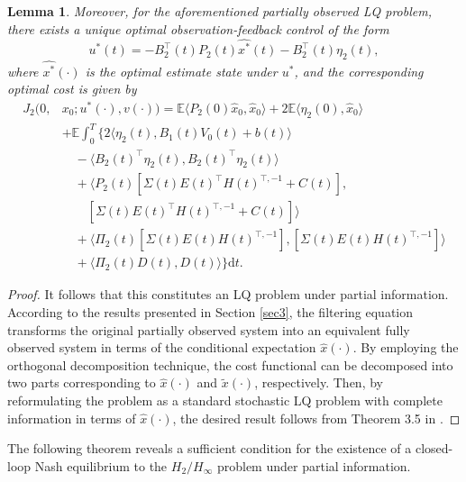\documentclass[lettersize,journal]{IEEEtran}
\theoremstyle{plain}
\newtheorem{lem}[thm]{Lemma}
\theoremstyle{definition}
\begin{document}
\begin{lem}
	Moreover, for the aforementioned partially observed LQ problem, there exists a unique optimal observation-feedback control of the form 
	\[
	u^*(t) = -B_2^{\top}(t)P_2(t)\widehat{x^*}(t) - B_2^{\top}(t)\eta_2(t),
	\]
	where $\widehat{x^*}(\cdot)$ is the optimal estimate state under $u^*$,
	and the corresponding optimal cost is given by
	\begin{equation}\label{eq:5.12}
		\begin{aligned}
			J_2(0,&x_0;u^*(\cdot),v(\cdot)) = \mathbb{E} \langle P_2(0)\widehat{x}_0,\widehat{x}_0 \rangle + 2\mathbb{E}\langle \eta_2(0),\widehat{x}_0 \rangle\\
			&+ \mathbb{E}\int_0^T \Big\{ 2\langle \eta_2(t),B_1(t)V_0(t) + b(t) \rangle \\
			&\quad - \langle B_2(t)^\top \eta_2(t),B_2(t)^\top \eta_2(t) \rangle\\
			&\quad + \langle P_2(t)[\Sigma(t) E(t)^\top H(t)^{\top,-1} + C(t)],\\
			&\qquad [\Sigma(t)E(t)^\top H(t)^{\top,-1} + C(t)] \rangle\\
			&\quad +\langle\Pi_2(t)[\Sigma(t)E(t)H(t)^{\top,-1}],[\Sigma(t)E(t)H(t)^{\top,-1}]\rangle \\
			&\quad + \langle\Pi_2(t)D(t),D(t)\rangle \Big\} \mathrm{d}t.
		\end{aligned}
	\end{equation}
\end{lem}

\begin{proof}
	It follows that this constitutes an LQ problem under partial information. According to the results presented in Section \ref{sec3}, the filtering equation transforms the original partially observed system into an equivalent fully observed system in terms of the conditional expectation $\widehat{x}(\cdot)$. By employing the orthogonal decomposition technique, the cost functional can be decomposed into two parts corresponding to $\widehat{x}(\cdot)$ and $\widetilde{x}(\cdot)$, respectively. Then, by reformulating the problem as a standard stochastic LQ problem with complete information in terms of $\widehat{x}(\cdot)$, the desired result follows from Theorem 3.5 in \cite{Sun2022}.
\end{proof}

The following theorem reveals a sufficient condition for the existence of a closed-loop Nash equilibrium to the $H_2/H_\infty$ problem under partial information.
\end{document}
